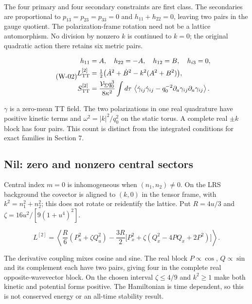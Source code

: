 The four primary and four secondary constraints are first class. The secondaries are proportional to $p_{13}=p_{23}=p_{33}=0$ and $h_{11}+h_{22}=0$, leaving two pairs in the gauge quotient. The polarization-frame rotation need not be a lattice automorphism. No division by nonzero $k$ is continued to $k=0$; the original quadratic action there retains six metric pairs.

\begin{equation}\tag{W-02}\label{eq:W-02}
\begin{aligned}h_{11}&=A,\quad h_{22}=-A,\quad h_{12}=B,\quad h_{i3}=0,\\ L^{[2]}_{\rm TT}&=\tfrac12\bigl(\dot A^2+\dot B^2-k^2(A^2+B^2)\bigr),\\ S^{[2]}_{\rm TT}&=\frac{\mathcal V_{\Sigma}q_0^3}{8\kappa^2}\int d\tau\,\left\langle\dot\gamma_{ij}\dot\gamma_{ij}-q_0^{-2}\partial_a\gamma_{ij}\partial_a\gamma_{ij}\right\rangle.\end{aligned}
\end{equation}

$\gamma$ is a zero-mean TT field. The two polarizations in one real quadrature have positive kinetic terms and $\omega^2=|k|^2/q_0^2$ on the static torus. A complete real $\pm k$ block has four pairs. This count is distinct from the integrated conditions for exact families in Section 7.

\subsection{Nil: zero and nonzero central sectors}

Central index $m=0$ is inhomogeneous when $(n_1,n_2)\ne0$. On the LRS background the covector is aligned to $(k,0)$ in the tensor frame, with $k^2=n_1^2+n_2^2$; this does not rotate or reidentify the lattice. Put $R=4u/3$ and $\zeta=16u^2/[9(1+u^4)^2]$.

\begin{equation}\tag{N-01}\label{eq:N-01}
L^{[2]}=\left\langle\frac R6(P_u^2+\zeta Q_u^2)
-\frac{3R}{2}\bigl[P_x^2+\zeta(Q_x^2-4PQ_x+2P^2)\bigr]\right\rangle.
\end{equation}

The derivative coupling mixes cosine and sine. The real block $P\propto\cos$, $Q\propto\sin$ and its complement each have two pairs, giving four in the complete real opposite-wavevector block. On the chosen interval $\zeta\le4/9$ and $k^2\ge1$ make both kinetic and potential forms positive. The Hamiltonian is time dependent, so this is not conserved energy or an all-time stability result.

